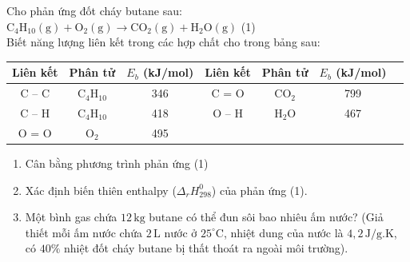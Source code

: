 \documentclass[Main.tex]{subfiles}
\begin{document}
\begin{bt}
	Cho phản ứng đốt cháy butane sau:
	\\
	$\mathrm{C_4H_{10}(g) + O_2(g) \longrightarrow CO_2(g) + H_2O(g)}$ \hspace{6cm} (1)
	\\
	Biết năng lượng liên kết trong các hợp chất cho trong bảng sau:
	\begin{center}
			\begin{tabular}{|c|c|c|c|c|c|c|}
				\hline
				Liên kết & Phân tử & $E_b$ (kJ/mol) & Liên kết & Phân tử & $E_b$ (kJ/mol) \\
				\hline
				C – C   & $\mathrm{C_4H_{10}}$ & 346 & C = O   & $\mathrm{CO_2}$ & 799 \\
				\hline
				C – H   & $\mathrm{C_4H_{10}}$ & 418  & O – H   & $\mathrm{H_2O}$ & 467 \\
				\hline
				O = O   & $\mathrm{O_2}$      & 495 &         &             &     \\
				\hline
			\end{tabular}
	\end{center}
	\begin{enumerate}
		\item Cân bằng phương trình phản ứng (1)
		\item Xác định biến thiên enthalpy ($\Delta_rH_{298}^0$) của phản ứng (1).
		\item Một bình gas chứa $12\,\mathrm{kg}$ butane có thể đun sôi bao nhiêu ấm nước? (Giả thiết mỗi ấm nước chứa $2\,\mathrm{L}$ nước ở $25^\circ\mathrm{C}$, nhiệt dung của nước là $4{,}2\,\mathrm{J/g.K}$, có $40\%$ nhiệt đốt cháy butane bị thất thoát ra ngoài môi trường).
	\end{enumerate}
\end{bt}
\end{document}
